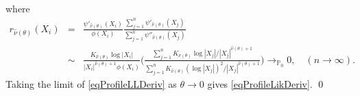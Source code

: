\documentclass[11pt]{article}
\theoremstyle{definition}
\def\Prob{{\mathbb P}}
\begin{document}
\begin{appendix}
\begin{equation}
	\end{equation}
	where
	\begin{eqnarray*}
		r_{\hat{\nu}(\theta)}(X_i)&=&\frac{\psi'_{\hat\nu(\theta)}(X_i)}{\phi(X_i)}\frac{\sum_{j=1}^n \psi'_{\hat\nu(\theta)}(X_j)}{\sum_{j=1}^n \psi''_{\hat\nu(\theta)}(X_j)} \\
		&\sim& \frac{K_{\hat{\nu}(\theta)} \log |X_i|}{|X_i|^{\hat{\nu}(\theta)+1} \phi(X_i)}\biggl(\frac{\sum_{j=1}^n K_{\hat{\nu}(\theta)} \log |X_j|/|X_j|^{\hat{\nu}(\theta)+1}}{\sum_{j=1}^n K_{\hat{\nu}(\theta)}(\log |X_j|)^2/|X_j|^{\hat{\nu}(\theta)+1}}\biggr)\rightarrow_{\Prob_0} 0, \quad (n\rightarrow \infty).
	\end{eqnarray*}
	Taking the limit of \eqref{eqProfileLLDeriv} as $\theta\rightarrow 0$ gives \eqref{eqProfileLikDeriv}. \qed
	
\end{appendix}


\bigskip
\bigskip
\end{document}
